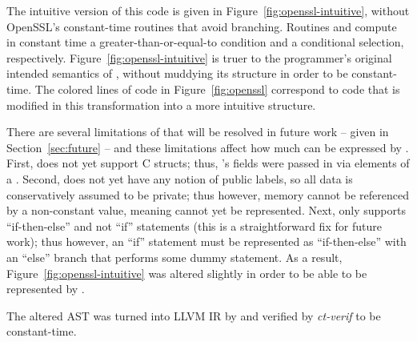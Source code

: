 The intuitive version of this code is given in Figure~\ref{fig:openssl-intuitive}, without OpenSSL's constant-time routines that avoid branching. Routines  and  compute in constant time a greater-than-or-equal-to condition and a conditional selection, respectively. Figure~\ref{fig:openssl-intuitive} is truer to the programmer's original intended semantics of , without muddying its structure in order to be constant-time. The colored lines of code in Figure~\ref{fig:openssl} correspond to code that is modified in this transformation into a more intuitive structure.

There are several limitations of \constc that will be resolved in future work -- given in Section~\ref{sec:future} -- and these limitations affect how much  can be expressed by \ccore. First, \ccore does not yet support C structs; thus, 's fields were passed in via elements of a \bytearray. Second, \ccore does not yet have any notion of public labels, so all data is conservatively assumed to be private; thus however, memory cannot be referenced by a non-constant value, meaning  cannot yet be represented. Next, \ccore only supports ``if-then-else'' and not ``if'' statements (this is a straightforward fix for future work); thus however, an ``if'' statement must be represented as ``if-then-else'' with an ``else'' branch that performs some dummy statement. As a result, Figure~\ref{fig:openssl-intuitive} was altered slightly in order to be able to be represented by \ccore.

The altered  AST was turned into LLVM IR by \constc and verified by \emph{ct-verif} to be constant-time.
